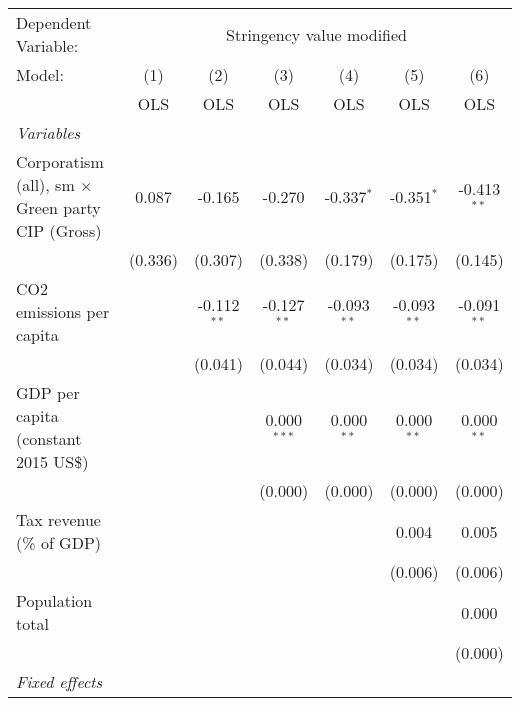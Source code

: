 
\begingroup
\centering
\begin{tabular}{lcccccc}
   \toprule
   Dependent Variable: & \multicolumn{6}{c}{Stringency value modified}\\
   Model:                                                  & (1)     & (2)           & (3)           & (4)           & (5)           & (6)\\  
                                                           &  OLS    & OLS           & OLS           & OLS           & OLS           & OLS\\  
   \midrule
   \emph{Variables}\\
   Corporatism (all), sm $\times$ Green party CIP (Gross)  & 0.087   & -0.165        & -0.270        & -0.337$^{*}$  & -0.351$^{*}$  & -0.413$^{**}$\\   
                                                           & (0.336) & (0.307)       & (0.338)       & (0.179)       & (0.175)       & (0.145)\\   
   CO2 emissions per capita                                &         & -0.112$^{**}$ & -0.127$^{**}$ & -0.093$^{**}$ & -0.093$^{**}$ & -0.091$^{**}$\\   
                                                           &         & (0.041)       & (0.044)       & (0.034)       & (0.034)       & (0.034)\\   
   GDP per capita (constant 2015 US\$)                     &         &               & 0.000$^{***}$ & 0.000$^{**}$  & 0.000$^{**}$  & 0.000$^{**}$\\   
                                                           &         &               & (0.000)       & (0.000)       & (0.000)       & (0.000)\\   
   Tax revenue (\% of GDP)                                 &         &               &               &               & 0.004         & 0.005\\   
                                                           &         &               &               &               & (0.006)       & (0.006)\\   
   Population total                                        &         &               &               &               &               & 0.000\\   
                                                           &         &               &               &               &               & (0.000)\\   
   \emph{Fixed effects}\\

\end{tabular}
